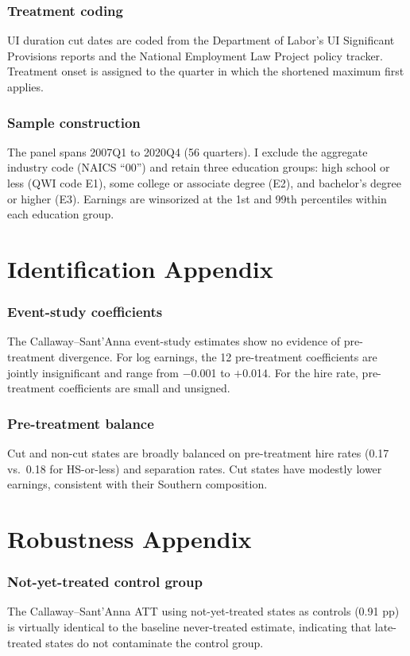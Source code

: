 \documentclass[12pt]{article}
\begin{document}
\subsubsection*{Treatment coding} UI duration cut dates are coded from the Department of Labor's UI Significant Provisions reports and the National Employment Law Project policy tracker. Treatment onset is assigned to the quarter in which the shortened maximum first applies.

\subsubsection*{Sample construction} The panel spans 2007Q1 to 2020Q4 (56 quarters). I exclude the aggregate industry code (NAICS ``00'') and retain three education groups: high school or less (QWI code E1), some college or associate degree (E2), and bachelor's degree or higher (E3). Earnings are winsorized at the 1st and 99th percentiles within each education group.

\section{Identification Appendix}

\subsubsection*{Event-study coefficients} The Callaway--Sant'Anna event-study estimates show no evidence of pre-treatment divergence. For log earnings, the 12 pre-treatment coefficients are jointly insignificant and range from $-$0.001 to $+$0.014. For the hire rate, pre-treatment coefficients are small and unsigned.

\subsubsection*{Pre-treatment balance} Cut and non-cut states are broadly balanced on pre-treatment hire rates (0.17 vs.\ 0.18 for HS-or-less) and separation rates. Cut states have modestly lower earnings, consistent with their Southern composition.

\section{Robustness Appendix}

\subsubsection*{Not-yet-treated control group} The Callaway--Sant'Anna ATT using not-yet-treated states as controls (0.91 pp) is virtually identical to the baseline never-treated estimate, indicating that late-treated states do not contaminate the control group.
\end{document}
